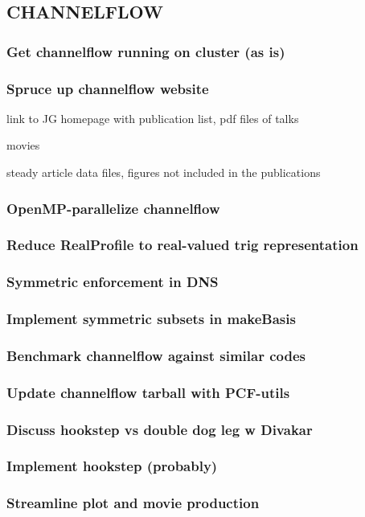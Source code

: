 
\subsection{CHANNELFLOW}

\subsubsection{Get channelflow running on cluster (as is)}

\subsubsection{Spruce up channelflow website}

link to JG homepage with publication list, pdf files of talks

movies

steady article data files, figures not included in the publications


\subsubsection{OpenMP-parallelize channelflow}
\subsubsection{Reduce RealProfile to real-valued trig representation}
\subsubsection{Symmetric enforcement in DNS}
\subsubsection{Implement symmetric subsets in makeBasis}
\subsubsection{Benchmark channelflow against similar codes}
\subsubsection{Update channelflow tarball with PCF-utils}
\subsubsection{Discuss hookstep vs double dog leg w Divakar}
\subsubsection{Implement hookstep (probably)}
\subsubsection{Streamline plot and movie production}



